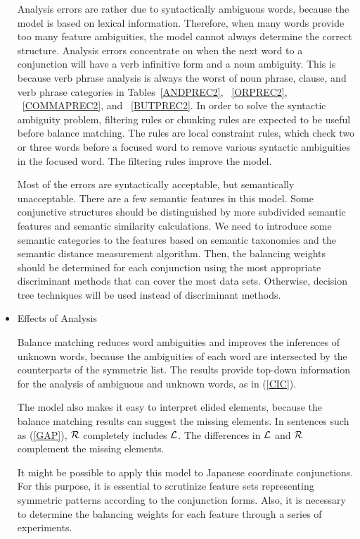 \begin{itemize}
Analysis errors are rather due to syntactically ambiguous
words, because the model is based on lexical information. Therefore,
when many words provide too many feature ambiguities, the model cannot
always determine the correct structure.  Analysis errors concentrate on
when the next word to a conjunction will have a verb infinitive form and
a noun ambiguity. This is because verb phrase analysis is always
the worst of noun phrase, clause, and verb phrase categories in
Tables~\ref{ANDPREC2}, ~\ref{ORPREC2}, ~\ref{COMMAPREC2}, and
~\ref{BUTPREC2}.  In order to solve the syntactic ambiguity
problem, filtering rules or chunking rules are expected to be useful
before balance matching.  The rules are local constraint
rules, which check two or three words before a focused word to
remove various syntactic ambiguities in the focused word. The filtering
rules improve the model.

Most of the errors are syntactically acceptable, but semantically
unacceptable. There are a few semantic features in this model.  Some
conjunctive structures should be distinguished by more subdivided
semantic features and semantic similarity calculations.  We need to
introduce some semantic categories to the features based on semantic
taxonomies and the semantic distance measurement
algorithm\cite{BUILDING,OKUMURA,Resnik93}.  Then, the balancing
weights should be determined for each conjunction using the most
appropriate discriminant methods that can cover the most data sets.
Otherwise, decision tree techniques will be used instead of
discriminant methods.


    \item  Effects of Analysis 

Balance matching reduces word ambiguities and improves
the inferences of unknown words, because the ambiguities of each
word are intersected by the counterparts of the symmetric list. The
results provide top-down information for the analysis of ambiguous
and unknown words, as in (\ref{CIC}). 

The model also makes it easy to interpret elided elements, because
the balance matching results can suggest the missing elements.  In
sentences such as (\ref{GAP}), $\cal R$ completely includes $\cal
L$. The differences in $\cal L$ and $\cal R$ complement the missing
elements.

It might be possible to apply this model to Japanese coordinate
conjunctions. For 
this purpose, it is essential to scrutinize feature sets representing
symmetric patterns according to the conjunction forms.
Also, it is necessary to determine the balancing weights for each
feature through a series of experiments.


  \end{itemize}

